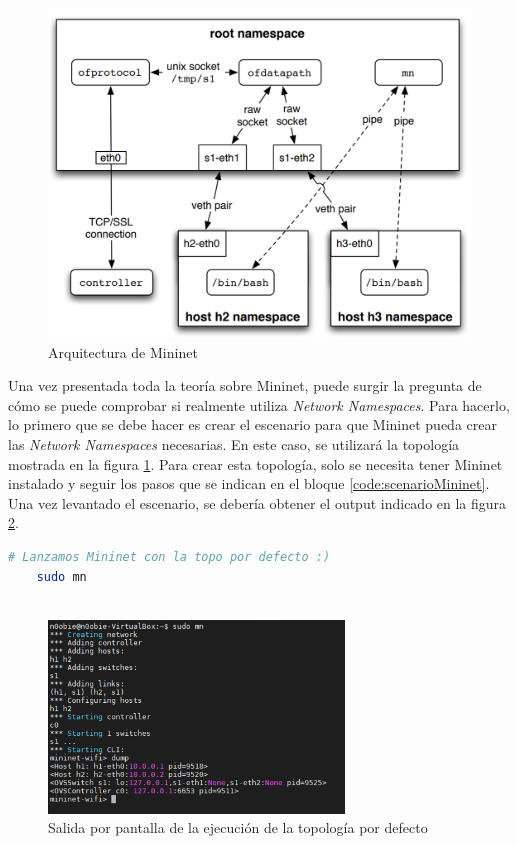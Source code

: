 \begin{figure}[ht]
    \centering
    \includegraphics[width=\textwidth]{archivos/img/teoria/mn_arch.png}
    \caption{Arquitectura de Mininet \cite{heller2013reproducible}}
    \label{fig:mininet_arch}
\end{figure}

Una vez presentada toda la teoría sobre Mininet, puede surgir la pregunta de cómo se puede comprobar si realmente utiliza \textit{Network Namespaces}. Para hacerlo, lo primero que se debe hacer es crear el escenario para que Mininet pueda crear las \textit{Network Namespaces} necesarias. En este caso, se utilizará la topología mostrada en la figura \ref{fig:mininet_arch}. Para crear esta topología, solo se necesita tener Mininet instalado y seguir los pasos que se indican en el bloque \ref{code:scenarioMininet}. Una vez levantado el escenario, se debería obtener el output indicado en la figura \ref{fig:mininet_01}.


\begin{lstlisting}[language= bash, style=Consola, caption={Ejecución de Mininet con la topología por defecto},label=code:scenarioMininet]
    # Lanzamos Mininet con la topo por defecto :)
    sudo mn
    
\end{lstlisting}
\vspace{0.5cm}

\begin{figure}[ht]
    \centering
    \includegraphics[width=0.7\textwidth]{archivos/img/teoria/mn_01.png}
    \caption{Salida por pantalla de la ejecución de la topología por defecto}
    \label{fig:mininet_01}
\end{figure}

